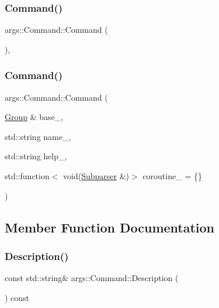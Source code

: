 \subsubsection{\texorpdfstring{Command()}{Command()}\hspace{0.1cm}{\footnotesize\ttfamily [1/2]}}
{\footnotesize\ttfamily args\+::\+Command\+::\+Command (\begin{DoxyParamCaption}{ }\end{DoxyParamCaption})\hspace{0.3cm}{\ttfamily [protected]}, {\ttfamily [default]}}

\mbox{\label{classargs_1_1_command_a181c94ddb38711478ec718ef17d4ad36}} 
\subsubsection{\texorpdfstring{Command()}{Command()}\hspace{0.1cm}{\footnotesize\ttfamily [2/2]}}
{\footnotesize\ttfamily args\+::\+Command\+::\+Command (\begin{DoxyParamCaption}\item[{\hyperlink{classargs_1_1_group}{Group} \&}]{base\+\_\+,  }\item[{std\+::string}]{name\+\_\+,  }\item[{std\+::string}]{help\+\_\+,  }\item[{std\+::function$<$ void(\hyperlink{classargs_1_1_subparser}{Subparser} \&)$>$}]{coroutine\+\_\+ = {\ttfamily \{\}} }\end{DoxyParamCaption})\hspace{0.3cm}{\ttfamily [inline]}}



\subsection{Member Function Documentation}
\mbox{\label{classargs_1_1_command_a01d237dc3c13323c143073dd2a1a2cb4}} 
\subsubsection{\texorpdfstring{Description()}{Description()}\hspace{0.1cm}{\footnotesize\ttfamily [1/2]}}
{\footnotesize\ttfamily const std\+::string\& args\+::\+Command\+::\+Description (\begin{DoxyParamCaption}{ }\end{DoxyParamCaption}) const\hspace{0.3cm}{\ttfamily [inline]}}

